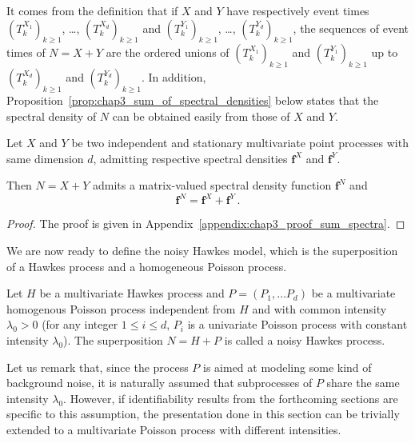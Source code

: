         It comes from the definition that if $X$ and $Y$ have respectively event times $(T_k^{X_1})_{k\ge1}$, \dots, $(T_k^{X_d})_{k\ge1}$ and $(T_k^{Y_1})_{k\ge1}$, \dots, $(T_k^{Y_d})_{k\ge1}$, the sequences of event times of $N = X + Y$ are the ordered unions of $(T_k^{X_1})_{k\geq1}$ and $(T_k^{Y_1})_{k\geq1}$ up to $(T_k^{X_d})_{k\geq1}$ and $(T_k^{Y_d})_{k\geq1}$.
        In addition, Proposition~\ref{prop:chap3_sum_of_spectral_densities} below states that the spectral density of $N$ can be obtained easily from those of $X$ and $Y$.

        \begin{proposition}\label{prop:chap3_sum_of_spectral_densities}
	        Let $X$ and $Y$ be two independent and stationary multivariate point processes with same dimension $d$, admitting respective spectral densities $\mathbf{f}^X$ and $\mathbf{f}^Y$.
	        
	        Then $N = X + Y$ admits a matrix-valued spectral density function $\mathbf f^N$ and
	        \begin{equation} \label{eq:chap3_sum_spectral_densities}
		        \mathbf{f}^N = \mathbf{f}^X + \mathbf{f}^Y\,.
	        \end{equation}
        \end{proposition}

        \begin{proof}
          The proof is given in Appendix~\ref{appendix:chap3_proof_sum_spectra}.
        \end{proof}

	      We are now ready to define the noisy Hawkes model, which is the superposition of a Hawkes process and a homogeneous Poisson process.
	      
	      \begin{definition}
		      Let $H$ be a multivariate Hawkes process
		      and $P=(P_1, \ldots P_d)$ be a multivariate homogenous Poisson process
		      independent from $H$ and
		      with common intensity $\lambda_0 > 0$ (\ie for any integer $1 \le i \le d$, $P_i$ is a univariate Poisson process with constant intensity $\lambda_0$).
		      The superposition $N = H + P$ is called a noisy Hawkes process.
	      \end{definition}
	      
	      Let us remark that, since the process $P$ is aimed at modeling
        some kind of background noise,
        it is naturally assumed that subprocesses of $P$ share the same intensity $\lambda_0$.
        However, if identifiability results from the forthcoming sections are specific to this assumption,
        the presentation done in this section can be trivially extended to a multivariate Poisson process with different intensities.
	      
